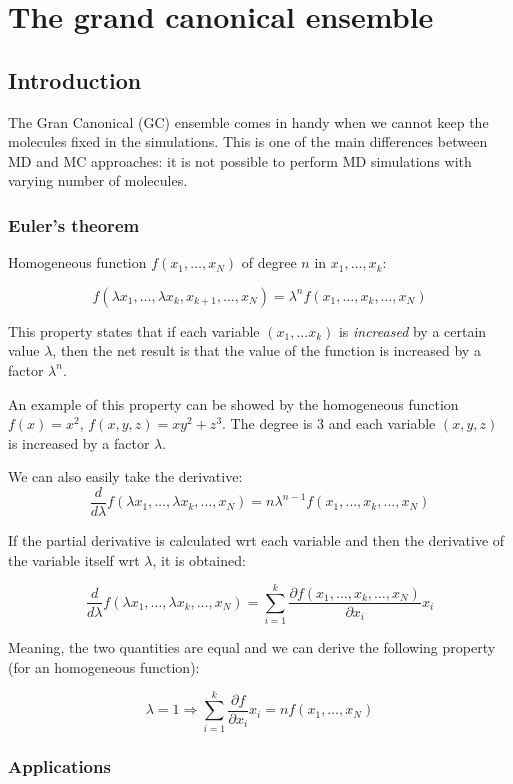 \graphicspath{{chapters/13/images/}}
\chapter{The grand canonical ensemble}

\section{Introduction}
The Gran Canonical (GC) ensemble comes in handy when we cannot keep the molecules fixed in the simulations. 
This is one of the main differences between MD and MC approaches: it is not possible to perform MD simulations with varying number of molecules.
	\subsection{Euler's theorem}
	
	Homogeneous function $f(x_1, \dots, x_N)$ of degree $n$ in $x_1, \dots, x_k$:

	$$f(\lambda x_1, \dots, \lambda x_k, x_{k+1}, \dots, x_N) = \lambda^n f(x_1, \dots, x_k, \dots, x_N)$$
	
	This property states that if each variable $(x_1, ... x_k)$ is \textit{increased} by a certain value $\lambda$, then the net result is that the value of the function is increased by a factor $\lambda^n$.
	
	An example of this property can be showed by the homogeneous function $f(x) = x^2$, $f(x, y, z) = xy^2+z^3$.
	The degree is $3$ and each variable $(x, y, z)$ is increased by a factor $\lambda$. 
	
	We can also easily take the derivative:
	$$\frac{d}{d\lambda} f(\lambda x_1, \dots, \lambda x_k, \dots, x_N) = n\lambda^{n-1}f(x_1, \dots, x_k,\dots, x_N)$$
	
	If the partial derivative is calculated wrt each variable and then the derivative of the variable itself wrt $\lambda$, it is obtained:
	
	$$\frac{d}{d\lambda}f(\lambda x_1, \dots, \lambda x_k, \dots, x_N) = \sum\limits_{i=1}^k\frac{\partial f(x_1, \dots, x_k, \dots, x_N)}{\partial x_i}x_i$$

Meaning, the two quantities are equal and we can derive the following property (for an homogeneous function):

	$$\lambda = 1 \Rightarrow \sum\limits_{i=1}^k\frac{\partial f}{\partial x_i}x_i = nf(x_1, \dots, x_N)$$

	\subsection{Applications}
	
